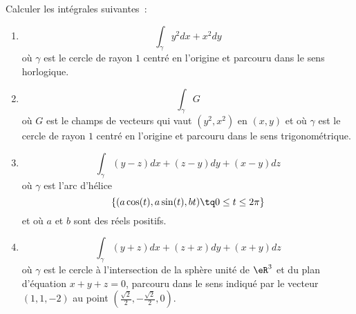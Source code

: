 
\begin{exercice}\label{exoVariete0011}

Calculer les intégrales suivantes~:
\begin{enumerate}
\item
  \begin{equation}
    \int_\gamma y^2 d x + x^2 d y
  \end{equation}
  où $\gamma$ est le cercle de rayon $1$ centré en l'origine et
  parcouru dans le sens horlogique.

\item
  \begin{equation}
    \int_\gamma G
  \end{equation}
  où $G$ est le champs de vecteurs qui vaut $(y^2,x^2)$ en $(x,y)$ et
  où $\gamma$ est le cercle de rayon $1$ centré en l'origine et
  parcouru dans le sens trigonométrique.

\item
  \begin{equation}
    \int_\gamma (y-z)d x + (z-y)d y + (x-y) d z
  \end{equation}
  où $\gamma$ est l'arc d'hélice
  \begin{equation*}
    \{ (a \cos(t), a \sin(t), b t) \tq 0 \leq t \leq 2\pi\}
  \end{equation*}
  et où $a$ et $b$ sont des réels positifs.
\item
  \begin{equation}
    \int_\gamma (y+z) d x + (z+x) d y + (x+y) d z
  \end{equation}
  où $\gamma$ est le cercle à l'intersection de la sphère unité de
  $\eR^3$ et du plan d'équation $x+y+z = 0$, parcouru dans le sens
  indiqué par le vecteur $(1,1,-2)$ au point
  $(\frac{\sqrt2}2,-\frac{\sqrt2}2,0)$.
\end{enumerate}


\end{exercice}
